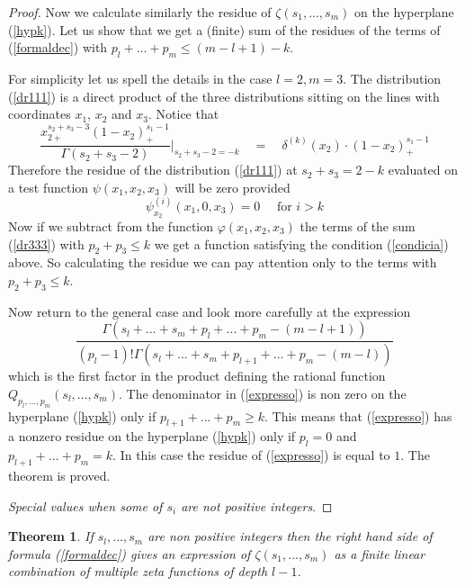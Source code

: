 \documentclass[10pt]{article}
\newtheorem{theorem}{Theorem}[section]
\begin{document}
\begin{proof}
  
Now we calculate similarly the residue of $\zeta(s_1,  ... , s_m)$ on the hyperplane (\ref{hypk}).  Let us show that   we  get a (finite) sum of the residues of the terms of (\ref{formaldec})   with  $p_l + ... + p_m \leq (m-l+1) - k$. 

For simplicity  let us
 spell the details in the case $l=2, m=3$.  The distribution (\ref{dr111}) is a direct product of the three distributions sitting on the lines with coordinates $x_1$, $x_2$ and $x_3$.  Notice that
$$
\frac{x_{2+}^{s_2 + s_3-3}  (1-x_2)_+^{s_1-1}}{\Gamma(s_2 +s_3 -2)}|_{s_2 +s_3 -2 = -k} 
\quad = \quad \delta^{(k)}(x_2) \cdot (1-x_2)_+^{s_1-1}
$$
Therefore the residue of the  distribution (\ref{dr111}) at  $s_2 + s_3 = 2-k$ 
evaluated on a test function $\psi(x_1,x_2,x_3)$  will be zero provided 
 \begin{equation} \label{condicia}
\psi^{(i)}_{x_2} (x_1, 0,x_3) = 0 \quad \mbox{ for $i >k$}
\end{equation} 
Now if we subtract from the function $\varphi(x_1,x_2,x_3)$ the terms of the sum (\ref{dr333}) with $p_2 + p_3 \leq k$ we get a function satisfying the condition (\ref{condicia}) above. So calculating the residue we can pay attention only to the terms with $p_2 + p_3 \leq k$.
 
Now return to the general case and look more carefully  at the    
expression
\begin{equation} \label{expresso} 
 \frac{\Gamma(s_{l} + ... +s_m +  p_l + ... + p_m  - (m-l+1))}{(p_l-1)!\Gamma(s_{l} + ... +s_m +  p_{l+1} + ... + p_m  - (m-l ))}
 \end{equation}
which is the first factor in the product defining the rational function \linebreak $Q_{p_l,...,p_m}(s_l,  ... , s_m)$.    The denominator in (\ref{expresso}) is non zero on the hyperplane
(\ref{hypk}) only if  $p_{l+1}+...+p_m  \geq k$. This means that (\ref{expresso}) has a nonzero residue on the hyperplane (\ref{hypk}) only if $p_l =0$ and $p_{l+1}+...+p_m   = k$. In this case the residue of (\ref{expresso}) is equal to $1$. The theorem is proved.


{\it Special values  when some of $s_i$ are   not positive
  integers}. 


\end{proof}

\begin{theorem} \label{decf}
If $s_l,...,s_m$ are  non positive   integers then the right hand side of formula (\ref{formaldec})    gives an expression of  $\zeta(s_1,  ... , s_m)$   as a finite linear combination of  multiple zeta functions of depth $l-1$.
 \end{theorem}
 
\end{document}
